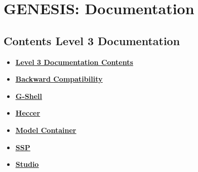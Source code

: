 \documentclass[12pt]{article}
\begin{document}
\section*{GENESIS: Documentation}

\subsection*{Contents Level 3 Documentation}

\begin{itemize}

\item \href{../contents-level3/contents-level3.pdf}{\bf \underline{Level 3 Documentation Contents}}

\item \href{../tests-g2-backward-compatibility/tests-g2-backward-compatibility.pdf}{\bf \underline{Backward Compatibility}}

\item \href{../tests-gshell/tests-gshell.pdf}{\bf \underline{G-Shell}}

\item \href{../tests-heccer/tests-heccer.pdf}{\bf \underline{Heccer}}

\item \href{../tests-model-container/tests-model-container.pdf}{\bf \underline{Model Container}}

\item \href{../tests-ssp/tests-ssp.pdf}{\bf \underline{SSP}}

\item \href{../tests-studio/tests-studio.pdf}{\bf \underline{Studio}}


\end{itemize}

\end{document}
